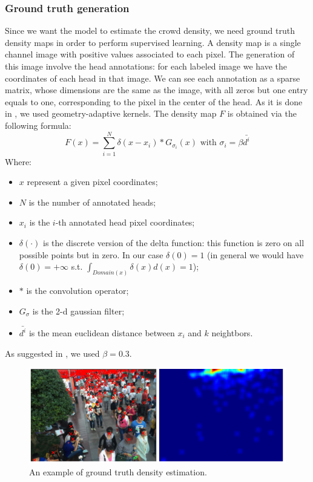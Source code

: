 \documentclass[10pt,twocolumn,letterpaper]{article}
\begin{document}
\subsubsection{Ground truth generation}
Since we want the model to estimate the crowd density, we need ground truth density maps in order to perform supervised learning. A density map is a single channel image with positive values associated to each pixel. The generation of this image involve the head annotations: for each labeled image we have the coordinates of each head in that image. We can see each annotation as a sparse matrix, whose dimensions are the same as the image, with all zeros but one entry equals to one, corresponding to the pixel in the center of the head. As it is done in \cite{zhang2016single}, we used geometry-adaptive kernels. The density map $F$ is obtained via the following formula: \begin{equation}
	F(x) = \sum_{i = 1}^{N}{\delta(x-x_i) * G_{\sigma_i}(x)} \text{ with } \sigma_i = \beta \bar{d^i}
\end{equation}
Where:
\begin{itemize}
	\item $x$ represent a given pixel coordinates;
	\item $N$ is the number of annotated heads;
	\item $x_i$ is the $i$-th annotated head pixel coordinates;
	\item $\delta(\cdot)$ is the discrete version of the delta function: this function is zero on all possible points but in zero. In our case $\delta(0) = 1$ (in general we would have $\delta(0) = +\infty$ s.t. $\int_{Domain(x)}\delta(x)d(x) = 1$);
	\item $*$ is the convolution operator;
	\item $G_{\sigma}$ is the 2-d gaussian filter;
	\item $\bar{d^i}$  is the mean euclidean distance between $x_i$ and $k$ neightbors.
\end{itemize}   
As suggested in \cite{zhang2016single}, we used $\beta = 0.3$.

\begin{figure}[h!]
	\includegraphics[width=\linewidth]{pics/DensityGT.png}
	\caption{An example of ground truth density estimation.}
	\label{fig:DensityGT}
\end{figure}
\end{document}
